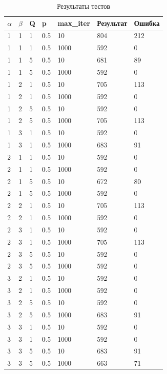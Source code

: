 \FloatBarrier
\begin{table}[h]
	\caption{Результаты тестов}
	\centering
	\begin{tabular}{ | l | l | l | l | l | l | l |}
		\hline
		$\alpha$ & $\beta$ & Q & p & max\_iter & Результат & Ошибка \\ 
		\hline
1 & 1 & 1 & 0.5 & 10 & 804 & 212 \\ 
1 & 1 & 1 & 0.5 & 1000 & 592 & 0 \\ 
1 & 1 & 5 & 0.5 & 10 & 681 & 89 \\ 
1 & 1 & 5 & 0.5 & 1000 & 592 & 0 \\ 
1 & 2 & 1 & 0.5 & 10 & 705 & 113 \\ 
1 & 2 & 1 & 0.5 & 1000 & 592 & 0 \\ 
1 & 2 & 5 & 0.5 & 10 & 592 & 0 \\ 
1 & 2 & 5 & 0.5 & 1000 & 705 & 113 \\ 
1 & 3 & 1 & 0.5 & 10 & 592 & 0 \\ 
1 & 3 & 1 & 0.5 & 1000 & 683 & 91 \\ 
2 & 1 & 1 & 0.5 & 10 & 592 & 0 \\ 
2 & 1 & 1 & 0.5 & 1000 & 592 & 0 \\ 
2 & 1 & 5 & 0.5 & 10 & 672 & 80 \\ 
2 & 1 & 5 & 0.5 & 1000 & 592 & 0 \\ 
2 & 2 & 1 & 0.5 & 10 & 705 & 113 \\
2 & 2 & 1 & 0.5 & 1000 & 592 & 0 \\  
2 & 3 & 1 & 0.5 & 10 & 592 & 0 \\ 
2 & 3 & 1 & 0.5 & 1000 & 705 & 113 \\ 
2 & 3 & 5 & 0.5 & 10 & 592 & 0 \\ 
2 & 3 & 5 & 0.5 & 1000 & 592 & 0 \\  
3 & 2 & 1 & 0.5 & 10 & 592 & 0 \\ 
3 & 2 & 1 & 0.5 & 1000 & 592 & 0 \\ 
3 & 2 & 5 & 0.5 & 10 & 592 & 0 \\ 
3 & 2 & 5 & 0.5 & 1000 & 683 & 91 \\ 
3 & 3 & 1 & 0.5 & 10 & 592 & 0 \\ 
3 & 3 & 1 & 0.5 & 1000 & 592 & 0 \\ 
3 & 3 & 5 & 0.5 & 10 & 683 & 91 \\ 
3 & 3 & 5 & 0.5 & 1000 & 663 & 71 \\ 
		\hline
\end{tabular}
\end{table}
\FloatBarrier



